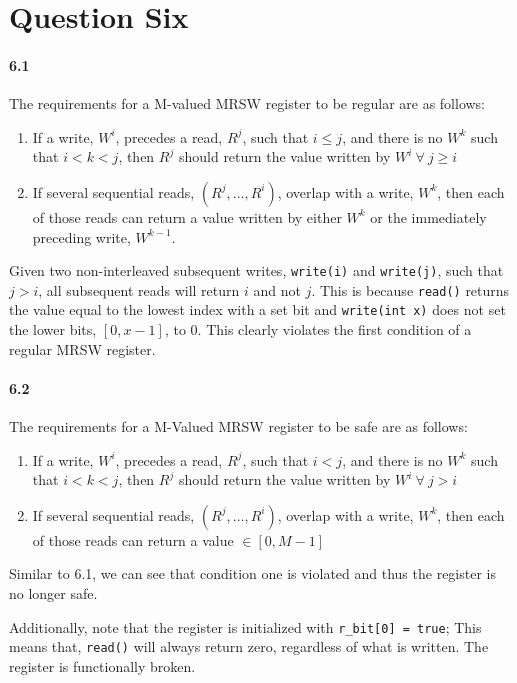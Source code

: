 \documentclass[12pt,letterpaper,titlepage]{article}
\begin{document}
  \section{Question Six}
    \paragraph{6.1} The requirements for a M-valued MRSW register to be regular are as follows:
    \begin{enumerate}
      \itemsep 0em
      \item If a write, $W^i$, precedes a read, $R^j$, such that $i \le j$, and there is no $W^k$ such that $i < k < j$, then $R^j$ should return the value written by $W^i \ \forall \ j \ge i$
      \item If several sequential reads, $(R^j,\dots,R^i)$, overlap with a write, $W^k$, then each of those reads can return a value written by either $W^k$ or the immediately preceding write, $W^{k-1}$.
    \end{enumerate}
    Given two non-interleaved subsequent writes, \texttt{write(i)} and \texttt{write(j)}, such that $j > i$, all subsequent reads will return $i$ and not $j$. This is because \texttt{read()} returns the value equal to the lowest index with a set bit and \texttt{write(int x)} does not set the lower bits, $[0, x-1]$, to 0. This clearly violates the first condition of a regular MRSW register.
    
    \paragraph{6.2} The requirements for a M-Valued MRSW register to be safe are as follows:
    \begin{enumerate}
      \itemsep 0em
      \item If a write, $W^i$, precedes a read, $R^j$, such that $i < j$, and there is no $W^k$ such that $i < k < j$, then $R^j$ should return the value written by $W^i \ \forall \ j > i$
      \item If several sequential reads, $(R^j,\dots,R^i)$, overlap with a write, $W^k$, then each of those reads can return a value $\in [0, M-1]$
    \end{enumerate}
    Similar to 6.1, we can see that condition one is violated and thus the register is no longer safe.
    
    Additionally, note that the register is initialized with \texttt{r\_bit[0] = true}; This means that, \texttt{read()} will always return zero, regardless of what is written. The register is functionally broken.
  
\end{document}
